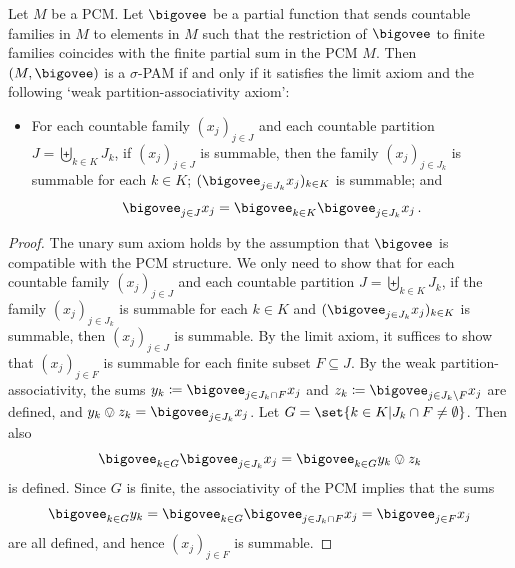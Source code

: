\documentclass[%
	submission,
copyright,creativecommons,UKenglish]{eptcs}
\begin{document}
\begin{Auxproof}
\begin{lemma}
\label{lem:pam-equiv}
Let $M$ be a PCM.
Let $\bigovee$ be a
partial function that sends
countable families in $M$ to elements in $M$
such that the restriction of $\bigovee$
to finite families coincides with
the finite partial sum in the PCM $M$.
Then $(M,\bigovee)$ is a $\sigma$-PAM
if and only if
it satisfies the limit axiom
and the following `weak partition-associativity axiom':
\begin{itemize}
\item
For each countable family $(x_j)_{j\in J}$
and each countable partition $J=\biguplus_{k\in K} J_k$,
if $(x_j)_{j\in J}$ is summable, then
the family $(x_j)_{j\in J_k}$ is summable for each $k\in K$;
$(\bigovee_{j\in J_k} x_j)_{k\in K}$ is summable;
and
\[
\bigovee_{j\in J} x_j
=
\bigovee_{k\in K}
\bigovee_{j\in J_k} x_j
\mpunct.
\]
\end{itemize}
\end{lemma}
\begin{proof}
The unary sum axiom holds by
the assumption that $\bigovee$ is compatible
with the PCM structure.
We only need to show that
for each countable family
$(x_j)_{j\in J}$
and each countable partition $J=\biguplus_{k\in K} J_k$,
if the family $(x_j)_{j\in J_k}$ is summable for each $k\in K$
and $(\bigovee_{j\in J_k} x_j)_{k\in K}$ is summable,
then $(x_j)_{j\in J}$ is summable.
By the limit axiom,
it suffices to show that
$(x_j)_{j\in F}$
is summable for each finite subset $F\subseteq J$.
By the weak partition-associativity,
the sums $y_k\coloneqq \bigovee_{j\in J_k\cap F}
x_j$
and $z_k\coloneqq \bigovee_{j\in J_k\setminus F}
x_j$ are defined, and
$y_k\ovee z_k=\bigovee_{j\in J_k}x_j$.
Let $G=\set{k\in K| J_k\cap F\neq \emptyset}$.
Then also
\[
\bigovee_{k\in G} \bigovee_{j\in J_k}x_j
=\bigovee_{k\in G} y_k\ovee z_k
\]
is defined.
Since $G$ is finite,
the associativity of the PCM
implies that the sums
\[
\bigovee_{k\in G} y_k=
\bigovee_{k\in G}
\bigovee_{j\in J_k\cap F} x_j
=\bigovee_{j\in F} x_j
\]
are all defined, and hence
$(x_j)_{j\in F}$ is summable.
\end{proof}


\end{Auxproof}
\end{document}
